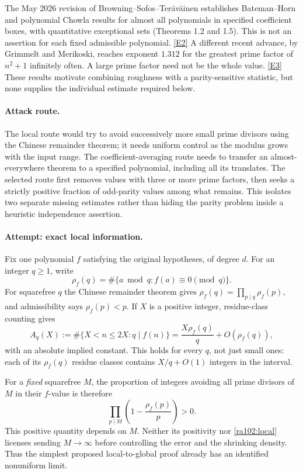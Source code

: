 \documentclass[11pt]{article}
\newcommand{\eref}[2]{\hyperlink{extra:#1:#2}{[E#2]}}
\begin{document}
The May 2026 revision of Browning--Sofos--Ter\"av\"ainen establishes
Bateman--Horn and polynomial Chowla results for almost all polynomials in
specified coefficient boxes, with quantitative exceptional sets
(Theorems 1.2 and 1.5). This is not an assertion for each fixed admissible
polynomial. \eref{102}{2}
A different recent advance, by Grimmelt and Merikoski, reaches exponent
$1.312$ for the greatest prime factor of $n^2+1$ infinitely often. A large
prime factor need not be the whole value. \eref{102}{3}
These results motivate combining roughness with a parity-sensitive statistic,
but none supplies the individual estimate required below.

\paragraph{Attack route.}
The local route would try to avoid successively more small prime divisors
using the Chinese remainder theorem; it needs uniform control as the modulus
grows with the input range. The coefficient-averaging route needs to transfer
an almost-everywhere theorem to a specified polynomial, including all its
translates. The selected route first removes values with three or more prime
factors, then seeks a strictly positive fraction of odd-parity values among
what remains. This isolates two separate missing estimates rather than hiding
the parity problem inside a heuristic independence assertion.

\paragraph{Attempt: exact local information.}
Fix one polynomial $f$ satisfying the original hypotheses, of degree $d$.
For an integer $q\ge1$, write
\[
 \rho_f(q)=\#\{a\bmod q:f(a)\equiv0\pmod q\}.
\]
For squarefree $q$ the Chinese remainder theorem gives
$\rho_f(q)=\prod_{p\mid q}\rho_f(p)$, and admissibility says
$\rho_f(p)<p$. If $X$ is a positive integer, residue-class counting gives
\begin{equation}\label{ra102:local}
 A_q(X):=\#\{X<n\le2X:q\mid f(n)\}
       =\frac{X\rho_f(q)}q+O(\rho_f(q)),
\end{equation}
with an absolute implied constant. This holds for every $q$, not just small
ones: each of its $\rho_f(q)$ residue classes contains $X/q+O(1)$ integers
in the interval.

For a \emph{fixed} squarefree $M$, the proportion of integers avoiding all
prime divisors of $M$ in their $f$-value is therefore
\[
 \prod_{p\mid M}\left(1-\frac{\rho_f(p)}p\right)>0.
\]
This positive quantity depends on $M$. Neither its positivity nor
\eqref{ra102:local} licenses sending $M\to\infty$ before controlling the
error and the shrinking density. Thus the simplest proposed local-to-global
proof already has an identified nonuniform limit.
\end{document}
